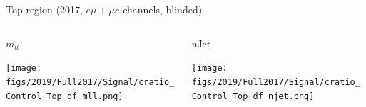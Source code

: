 \documentclass[9pt]{beamer}
\begin{document}
\begin{frame}{Top region (2017, $e \mu + \mu e$ channels, blinded)}
\begin{columns}
		\begin{column}{0.32\textwidth}
			\begin{center}
				\begin{block}{\centering $m_{ll}$}\end{block}
     			\texttt{[image: figs/2019/Full2017/Signal/cratio\_Control\_Top\_df\_mll.png]}
    		\end{center}		
		\end{column} \hfill
		\begin{column}{0.32\textwidth}
			\begin{center}
\begin{block}{\centering nJet}\end{block}
     			\texttt{[image: figs/2019/Full2017/Signal/cratio\_Control\_Top\_df\_njet.png]}
    		\end{center}		
		\end{column} \hfill
	\end{columns}
\end{frame}
\end{document}
